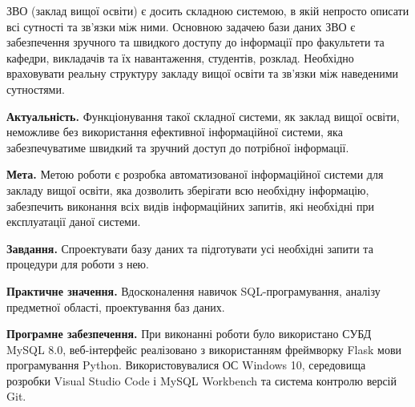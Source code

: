 \newpage
{}

ЗВО (заклад вищої освіти) є досить складною системою, в якій непросто описати всі
сутності та зв'язки між ними. Основною задачею бази даних ЗВО є забезпечення зручного
та швидкого доступу до інформації про факультети та кафедри, викладачів та їх навантаження, студентів, розклад.
Необхідно враховувати реальну структуру закладу вищої освіти та зв'язки між наведеними сутностями.

\textbf{Актуальність.} Функціонування такої складної системи, як заклад вищої освіти,
неможливе без використання ефективної інформаційної системи, яка забезпечуватиме 
швидкий та зручний доступ до потрібної інформації.

\textbf{Мета.} Метою роботи є розробка автоматизованої інформаційної системи
для закладу вищої освіти, яка дозволить зберігати всю необхідну інформацію, забезпечить 
виконання всіх видів інформаційних запитів, які необхідні при експлуатації даної 
системи.

\textbf{Завдання.} Спроектувати базу даних та підготувати усі необхідні 
запити та процедури для роботи з нею.

\textbf{Практичне значення.} Вдосконалення навичок SQL-програмування,
аналізу предметної області, проектування баз даних.

\textbf{Програмне забезпечення.} При виконанні роботи було використано
СУБД MySQL 8.0, веб-інтерфейс реалізовано з використанням фреймворку Flask
мови програмування Python. Використовувалися ОС Windows 10, середовища розробки
Visual Studio Code і MySQL Workbench та система контролю версій Git.